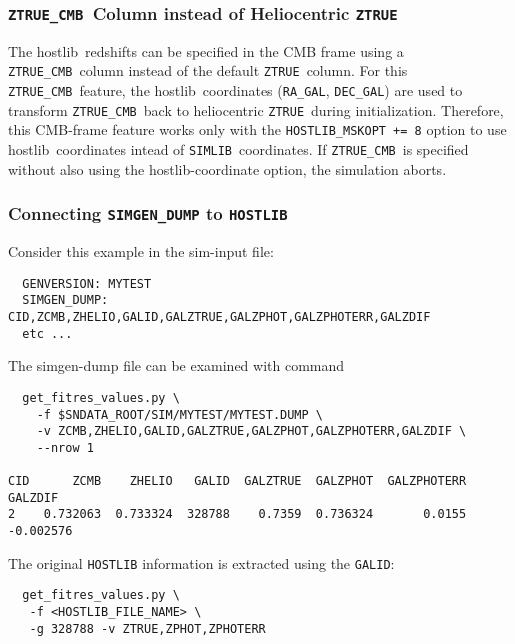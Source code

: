 \documentclass[12pt]{article}
\newcommand{\simlib}{{\tt SIMLIB}}
\newcommand{\hostlib}{{\sc hostlib}}
\newcommand{\ztruecmb}{{\tt ZTRUE\_CMB}}
\newcommand{\ztrue}{{\tt ZTRUE}}
\begin{document}
{%
\label{sss:ZTRUE_CMB}
\subsubsection{\ztruecmb\ Column instead of Heliocentric {\ztrue} }

The \hostlib\ redshifts can be specified in the CMB frame using a
\ztruecmb\ column instead of the default \ztrue\ column.
For this \ztruecmb\ feature, the \hostlib\ coordinates 
({\tt RA\_GAL}, {\tt DEC\_GAL}) are used to transform
\ztruecmb\ back to heliocentric \ztrue\ during initialization.
Therefore, this CMB-frame feature works only with the {\tt HOSTLIB\_MSKOPT += 8}
option to use \hostlib\ coordinates intead of \simlib\ coordinates.
If \ztruecmb\ is specified without also using the
{\hostlib}-coordinate option, the simulation aborts.



\clearpage
\subsubsection{Connecting {\tt SIMGEN\_DUMP} to {\tt HOSTLIB} }
\label{sss:dump_to_hostlib}

Consider this example in the sim-input file:
\begin{verbatim}
  GENVERSION: MYTEST
  SIMGEN_DUMP: CID,ZCMB,ZHELIO,GALID,GALZTRUE,GALZPHOT,GALZPHOTERR,GALZDIF
  etc ...
\end{verbatim}
%
The simgen-dump file can be examined with command
\begin{verbatim}
  get_fitres_values.py \
    -f $SNDATA_ROOT/SIM/MYTEST/MYTEST.DUMP \
    -v ZCMB,ZHELIO,GALID,GALZTRUE,GALZPHOT,GALZPHOTERR,GALZDIF \
    --nrow 1

CID      ZCMB    ZHELIO   GALID  GALZTRUE  GALZPHOT  GALZPHOTERR   GALZDIF
2    0.732063  0.733324  328788    0.7359  0.736324       0.0155 -0.002576
\end{verbatim}

The original {\tt HOSTLIB} information is extracted using the
{\tt GALID}:
\begin{verbatim}
  get_fitres_values.py \
   -f <HOSTLIB_FILE_NAME> \
   -g 328788 -v ZTRUE,ZPHOT,ZPHOTERR
        

\end{verbatim}}
\end{document}
